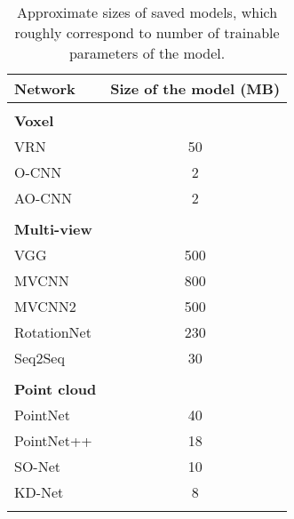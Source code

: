 \begin{table}[]
	\centering
	\begin{tabular}{lc}
		\hline
		\textbf{Network}       &\textbf{ Size of the model (MB)} \\ \hline
		                       &                       \\
		\textbf{Voxel }        &                       \\
		VRN                    &          50           \\
		O-CNN                  &           2           \\
		AO-CNN                 &           2           \\\hline
		                       &                       \\
		\textbf{Multi-view }   &                       \\
		VGG                    &          500          \\
		MVCNN                  &          800          \\
		MVCNN2                 &          500          \\
		RotationNet            &          230          \\
		Seq2Seq                &          30           \\\hline
		                       &                       \\
		\textbf{Point cloud  } &                       \\
		PointNet               &          40           \\
		PointNet++             &          18           \\
		SO-Net                 &          10           \\
		KD-Net                 &           8           \\\hline
		                       &                       \\ 
	\end{tabular}
\caption{Approximate sizes of saved models, which roughly correspond to number of trainable parameters of the model.}
\label{Table:memory}
\end{table}